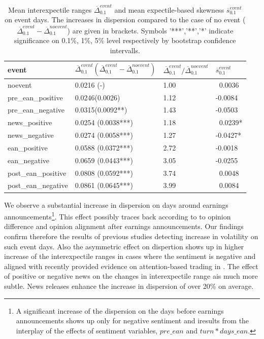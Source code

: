 \documentclass[]{article}
\begin{document}
\begin{table}[hb]
\centering
\caption{\label{tab:tabdelt1}Mean interexpectile ranges $\overline\Delta^{event}_{0.1}$ and mean expectile-based skewness $\overline s^{event}_{0.1}$ on event days. The increases in dispersion compared to the case of no event ($\overline\Delta^{event}_{0.1}-\overline\Delta^{noevent}_{0.1}$) are given in brackets.  Symbols '***','**','*' indicate significance on 0.1\%, 1\%, 5\% level respectively by bootstrap confidence intervalls.}
\begin{tabular}{llll}
  \hline
 event & $\overline\Delta_{0.1}^{event} (\overline\Delta_{0.1}^{event} - \overline\Delta_{0.1}^{noevent} )$ & $\overline\Delta_{0.1}^{event} /\overline\Delta_{0.1}^{noevent} $ & $\overline s_{0.1}^{event}$\\
  \hline
noevent & 0.0216 (-) & 1.00 & ~0.0036 \\
pre\_ean\_positive	&0.0246(0.0026)	&1.12	&-0.0084\\
pre\_ean\_negative	&0.0315(0.0092**)&	1.43&	-0.0503\\
 news\_positive & 0.0254 (0.0038***) & 1.18 & ~0.0239*\\
 news\_negative & 0.0274 (0.0058***) & 1.27 & -0.0427*\\
 ean\_positive & 0.0588 (0.0372***) & 2.72 & -0.0018 \\
  ean\_negative & 0.0659 (0.0443***) & 3.05 & -0.0255 \\
  post\_ean\_positive & 0.0808 (0.0592***) & 3.74 & ~0.0048 \\
  post\_ean\_negative & 0.0861 (0.0645***) & 3.99 & ~0.0084 \\
   \hline
\end{tabular}
\end{table}

We observe a substantial increase in dispersion on days around earnings announcements\footnote{A significant increase of the dispersion on the days before earnings announcements shows up only for negative sentiment and iresults from the interplay of the effects of sentiment variables, \(pre\_ean\) and \(turn*days\_ean\). }.  This effect possibly traces back according to \cite{BERKMAN2009} to opinion difference and opinion alignment after earnings announcements. Our findings confirm therefore the results of previous studies detecting increase in volatility on such event days. Also the asymmetric effect on dispertion shows up in higher increase of the interexpectile ranges in cases where the sentiment is negative and aligned with recently provided evidence on attention-based trading in \cite{barber2022}.  The effect of positive or negative news on the changes in interexpectile range ais much more subtle. News releases enhance the increase in dispersion of over 20\% on average. 
\end{document}
